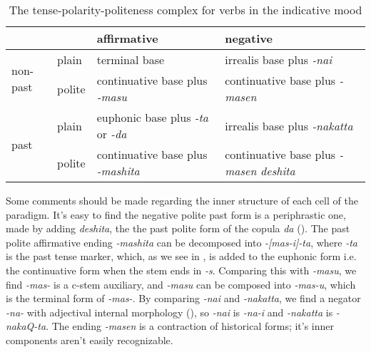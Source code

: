\documentclass[UTF8, a4paper, oneside, scheme=plain]{ctexrep}
\newcommand{\corpus}[1]{\emph{#1}}
\begin{document}
\begin{table}[H]
    \caption{The tense-polarity-politeness complex for verbs in the indicative mood}
    \label{tbl:tense-polarity-politeness}
    \begin{tabular}{llll}
        \toprule
        &                            & affirmative                                                       & negative                                                          \\
                              \midrule
    \multirow{2}{*}{non-past} & plain                      & terminal base                                                     & irrealis base plus \corpus{-nai}                                   \\
                              & polite                     & continuative base plus \corpus{-masu}                              & continuative base plus \corpus{-masen}                             \\ \midrule
    \multirow{2}{*}{past}     & \multicolumn{1}{l}{plain}  & \multicolumn{1}{l}{euphonic base plus \corpus{-ta} or \corpus{-da}} & \multicolumn{1}{l}{irrealis base plus \corpus{-nakatta}}           \\
                              & \multicolumn{1}{l}{polite} & \multicolumn{1}{l}{continuative base plus \corpus{-mashita}}       & \multicolumn{1}{l}{continuative base plus \corpus{-masen deshita}} \\
                              \bottomrule
    \end{tabular}
\end{table}

Some comments should be made regarding the inner structure of each cell of the paradigm.
It's easy to find the negative polite past form is a periphrastic one,
made by adding \corpus{deshita}, the the past polite form of the copula \corpus{da} 
().
The past polite affirmative ending \corpus{-mashita} can be decomposed into 
\corpus{-[mas-i]-ta},
where \corpus{-ta} is the past tense marker,
which, as we see in ,
is added to the euphonic form i.e. the continuative form when the stem ends in \corpus{-s}.
Comparing this with \corpus{-masu},
we find \corpus{-mas-} is a c-stem auxiliary,
and \corpus{-masu} can be composed into \corpus{-mas-u},
which is the terminal form of \corpus{-mas-}.
By comparing \corpus{-nai} and \corpus{-nakatta},
we find a negator \corpus{-na-} with adjectival internal morphology (),
so \corpus{-nai} is \corpus{-na-i} and \corpus{-nakatta} is \corpus{-nakaQ-ta}.
The ending \corpus{-masen} is a contraction of historical forms;
it's inner components aren't easily recognizable.
\end{document}
